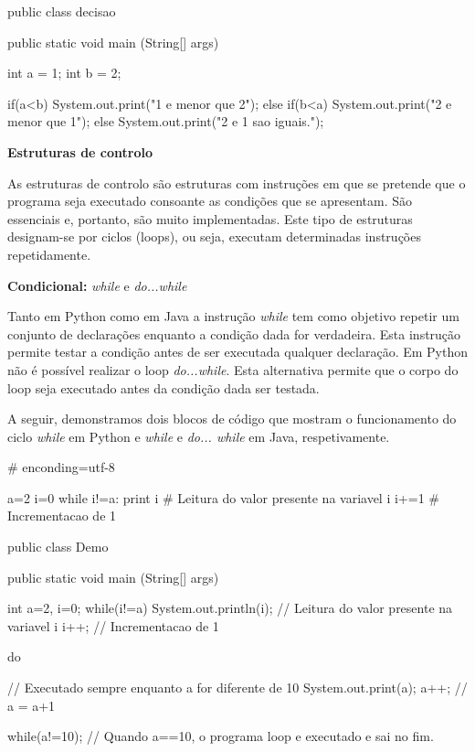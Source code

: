 \documentclass[11pt,openright,twoside]{report}
\begin{document}
\smallskip
\begin{Java}
public class decisao{
	public static void main (String[] args){		
	
		int a = 1;
		int b = 2;
				
		if(a<b){
			System.out.print("1 e menor que 2");
		}
		else if(b<a){
			System.out.print("2 e menor que 1");
		}
		else{
			System.out.print("2 e 1 sao iguais.");
		}
		
	}
}
\end{Java}
\medskip

\textbf{Estruturas de controlo}
\smallskip

As estruturas de controlo são estruturas com instruções em que se pretende que o programa seja executado consoante as condições que se apresentam. São essenciais e, portanto, são muito implementadas. Este tipo de estruturas designam-se por ciclos (loops), ou seja, executam determinadas instruções repetidamente. 
\medskip

\textbf{Condicional:} \textit{while} e \textit{do...while}

Tanto em Python como em Java a instrução \textit{while} tem como objetivo repetir um conjunto de declarações enquanto a condição dada for verdadeira. Esta instrução permite testar a condição antes de ser executada qualquer declaração.
Em Python não é possível realizar o loop \textit{do...while}. Esta alternativa permite que o corpo do loop seja executado antes da condição dada ser testada.

A seguir, demonstramos dois blocos de código que mostram o funcionamento do ciclo \textit{while} em Python e \textit{while} e \textit{do... while} em Java, respetivamente.

\smallskip
\begin{Python}
# enconding=utf-8

a=2
i=0
while i!=a:
	print i # Leitura do valor presente na variavel i
	i+=1 	# Incrementacao de 1
\end{Python}
\smallskip

\smallskip
\begin{Java}
public class Demo{
	public static void main (String[] args){
		int a=2, i=0;		
		while(i!=a){
			System.out.println(i); // Leitura do valor presente na variavel i
			i++; 			// Incrementacao de 1
		}
		
		do{					// Executado sempre enquanto a for diferente de 10
			System.out.print(a);
			a++;			// a = a+1
		
		}while(a!=10);		// Quando a==10, o programa loop e executado e sai no fim.
	}
}
\end{Java}
\smallskip
\end{document}

